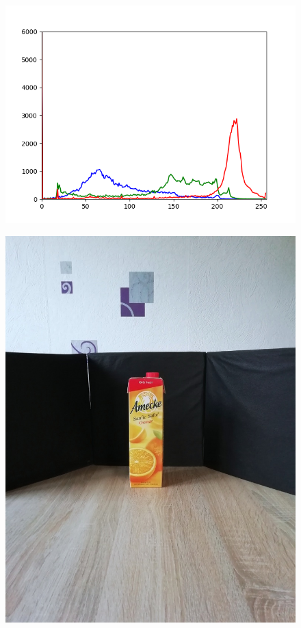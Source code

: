 \begin{appendices}
\begin{figure}[htb]
\begin{minipage}[c]{0.08\textwidth}
\end{minipage}
\hfill
\begin{minipage}[c]{0.3\textwidth}
\includegraphics[width=\textwidth]{Sources/Bild2_GW_histo.png}
\end{minipage}
\end{figure}
\begin{figure}[htb]
\begin{minipage}[c]{0.2\textwidth}
\includegraphics[width=\textwidth]{Sources/Bild3_GW.jpg}

\end{minipage}
\end{figure}
\end{appendices}
